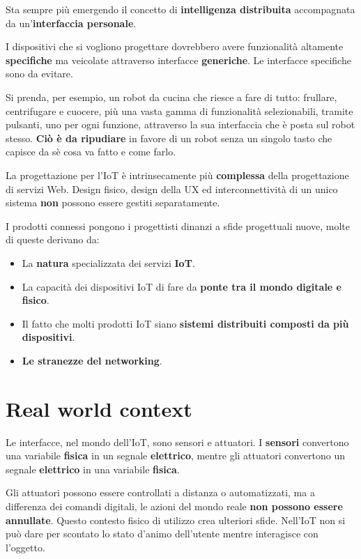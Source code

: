 \documentclass[a4paper,11pt,oneside]{book}
\begin{document}
Sta sempre più emergendo il concetto di \textbf{intelligenza distribuita} accompagnata da un'\textbf{interfaccia personale}.

I dispositivi che si vogliono progettare dovrebbero avere funzionalità altamente \textbf{specifiche} ma veicolate attraverso interfacce \textbf{generiche}. Le interfacce specifiche sono da evitare.

Si prenda, per esempio, un robot da cucina che riesce a fare
di tutto: frullare, centrifugare e cuocere, più una vasta gamma di funzionalità selezionabili, tramite pulsanti, uno per ogni funzione, attraverso la sua interfaccia che è posta sul robot stesso. \textbf{Ciò è da ripudiare} in favore di un robot senza un singolo tasto che capisce da sè cosa va fatto e come farlo.

La progettazione per l'IoT è intrinsecamente più \textbf{complessa} della progettazione di servizi Web. Design fisico, design della UX ed interconnettività di un unico sistema \textbf{non} possono essere gestiti separatamente.

I prodotti connessi pongono i progettisti dinanzi a sfide progettuali nuove, molte di queste derivano da:

\begin{itemize}
	\item La \textbf{natura} specializzata dei servizi \textbf{IoT}.
	\item La capacità dei dispositivi IoT di fare da \textbf{ponte tra il mondo digitale e fisico}.
	\item Il fatto che molti prodotti IoT siano \textbf{sistemi distribuiti composti da più dispositivi}.
	\item \textbf{Le stranezze del networking}.
\end{itemize}

\pagebreak

\section{Real world context}
Le interfacce, nel mondo dell'IoT, sono sensori e attuatori. I \textbf{sensori} convertono una variabile \textbf{fisica} in un segnale \textbf{elettrico}, mentre gli
attuatori convertono un segnale\textbf{ elettrico} in una variabile \textbf{fisica}.

Gli attuatori possono essere controllati a distanza o automatizzati, ma a differenza dei comandi digitali, le azioni del mondo reale \textbf{non possono essere annullate}.
Questo contesto fisico di utilizzo crea ulteriori sfide. Nell'IoT non si può dare per
scontato lo stato d'animo dell'utente mentre interagisce con l'oggetto.
\end{document}
